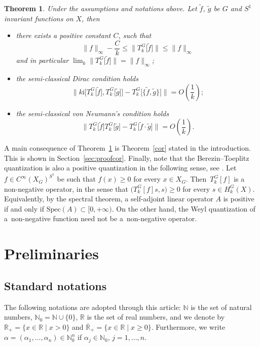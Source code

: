 \documentclass[pdftex]{sigma}
\numberwithin{equation}{section}
\newtheorem{Theorem}{Theorem}[section]
\begin{document}
	 \begin{Theorem} \label{thm:quant} Under the assumptions and notations above. Let $\widetilde{f}$, $\widetilde{g}$ be $G$ and $S^1$ invariant functions on $X$, then
	 	\begin{itemize}\itemsep=0pt
	 		\item[$(a)$] there exists a positive constant $C$, such that
	 		\[\lVert {f}\rVert_{\infty}-\frac{C}{k} \leq \big\lVert T^{G}_{k}\big[\widetilde{f}\big] \big\rVert \leq \lVert {f} \rVert_{\infty}
	 		\]
	 		and in particular $\lim_{k} \big\lVert T^{G}_{k}\big[\widetilde{f}\big] \big\rVert= \lVert {f}\rVert_{\infty}$;
	 		\item[$(b)$] the semi-classical Dirac condition holds
	 		\[ \big\lVert k\mathrm{i} \big[T^{G}_{k}\big[\widetilde{f}\big], T^{G}_{k}\big[\widetilde{g}\big]\big] -T^{G}_{k}\big[\big\{\widetilde{f}, \widetilde{g}\big\}\big]\big\rVert=O\left(\frac{1}{k}\right) ;\]
	 		\item[$(c)$] the semi-classical von Neumann's condition holds
	 		\[\big\lVert T^{G}_{k}\big[\widetilde{f}\big] T^{G}_{k}\big[\widetilde{g}\big] -T^{G}_{k}\big[\widetilde{f}\cdot \widetilde{g}\big]\big\rVert=O\left(\frac{1}{k}\right) .\]
	 	\end{itemize}
	 \end{Theorem}

 	A main consequence of Theorem~\ref{thm:quant} is Theorem~\ref{cor} stated in the introduction. This is shown in Section~\ref{sec:proofcor}.
Finally, note that the Berezin--Toeplitz quantization is also a positive quantization in the following sense, see \cite{lef}. Let $f \in C^{\infty}(X_G)^{S^1}$ be such that $f(x) \geq 0$ for every $x\in X_G$. Then~$T_k^G[f]$ is a non-negative operator, in the sense that $\bigl(T_k^G[f]s, s\bigr)\geq 0$ for every $s \in H_k^G(X)$. Equivalently, by the spectral theorem, a self-adjoint linear operator $A$ is positive if and only if ${\mathrm{Spec}(A)\subset [0, +\infty)}$.
	 On the other hand, the Weyl quantization of a~non-negative function need not be a~non-negative operator.
	
	
 	
	 \section{Preliminaries}\label{s:prelim}
	
	 \subsection{Standard notations} \label{s-ssna}
	 The following notations are adopted through this article: $\mathbb N$ is the set of natural numbers, $\mathbb N_0=\mathbb N\cup\{0\}$, $\mathbb R$ is the set of
	 real numbers, and we denote by ${\mathbb R}_+=\{x\in\mathbb R \mid x>0\}$ and $\overline{\mathbb R}_+=\{x\in\mathbb R\mid x\geq0\}$. Furthermore, we write $\alpha=(\alpha_1,\dots,\alpha_n)\in\mathbb N^n_0$
	 if $\alpha_j\in\mathbb N_0$,
	 $j=1,\dots,n$.
	
\end{document}
